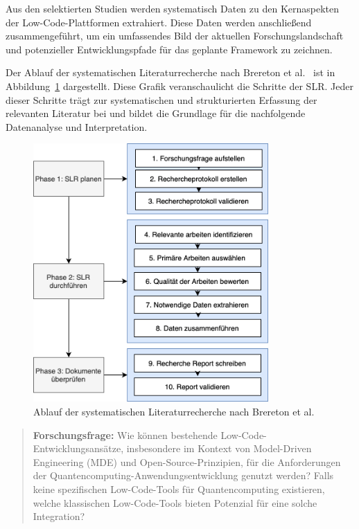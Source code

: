 Aus den selektierten Studien werden systematisch Daten zu den Kernaspekten der 
Low-Code-Plattformen extrahiert. Diese Daten werden anschließend zusammengeführt, um ein 
umfassendes Bild der aktuellen Forschungslandschaft und potenzieller Entwicklungspfade für 
das geplante Framework zu zeichnen.

Der Ablauf der systematischen Literaturrecherche nach Brereton et al.~\cite{brereton2007lessons} 
ist in Abbildung~\ref{fig:slr_kitchenham} dargestellt. 
Diese Grafik veranschaulicht die Schritte der SLR. Jeder dieser Schritte trägt zur systematischen und 
strukturierten Erfassung der relevanten Literatur bei und bildet die Grundlage für die nachfolgende 
Datenanalyse und Interpretation.

\begin{figure}[h!]
    \centering
    \includegraphics[width=0.8\textwidth]{graphics/slr_kitchenham_ablauf.png}
    \caption{Ablauf der systematischen Literaturrecherche nach Brereton et al.~\cite{brereton2007lessons}}
    \label{fig:slr_kitchenham}
\end{figure}


\begin{quote}
    \textbf{Forschungsfrage:} Wie können bestehende Low-Code-Entwicklungsansätze, insbesondere im Kontext von 
    Model-Driven Engineering (MDE) und Open-Source-Prinzipien, für die Anforderungen der Quantencomputing-Anwendungsentwicklung 
    genutzt werden? Falls keine spezifischen Low-Code-Tools für Quantencomputing existieren, welche klassischen Low-Code-Tools 
    bieten Potenzial für eine solche Integration?
    \label{research_question}
\end{quote}

